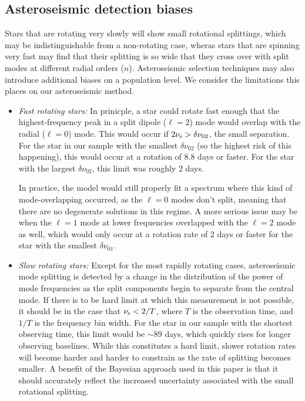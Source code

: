 \subsection{Asteroseismic detection biases}

Stars that are rotating very slowly will show small rotational splittings, which may be indistinguishable from a non-rotating case, wheras stars that are spinning very fast may find that their splitting is so wide that they cross over with split modes at different radial orders ($n$). Asteroseismic selection techniques may also introduce additional biases on a population level. We consider the limitations this places on our asteroseismic method.

\begin{itemize}
	\item \textit{Fast rotating stars:} In prinicple, a star could rotate fast enough that the highest-frequency peak in a split dipole ($\ell = 2$) mode would overlap with the radial ($\ell = 0$) mode. This would occur if $2\nu_{\rm s} > \delta\nu_{02}$, the small separation. For the star in our sample with the smallest $\delta\nu_{02}$ (so the highest risk of this happening), this would occur at a rotation of 8.8 days or faster. For the star with the largest $\delta\nu_{02}$, this limit was roughly 2 days.
	
	In practice, the model would still properly fit a spectrum where this kind of mode-overlapping occurred, as the $\ell = 0$ modes don't split, meaning that there are no degenerate solutions in this regime. A more serious issue may be when the $\ell = 1$ mode at lower frequencies overlapped with the $\ell = 2$ mode as well, which would only occur at a rotation rate of 2 days or faster for the star with the smallest $\delta\nu_{01}$.
	
	\item \textit{Slow rotating stars:} Except for the most rapidly rotating cases, asteroseismic mode splitting is detected by a change in the distribution of the power of mode frequencies as the split components begin to separate from the central mode. If there is to be hard limit at which this measurement is not possible, it should be in the case that $\nu_{\rm s} < 2/T$, where $T$ is the observation time, and $1/T$ is the frequency bin width. For the star in our sample with the shortest observing time, this limit would be $\sim 89$ days, which quickly rises for longer observing baselines. While this constitutes a hard limit, slower rotation rates will become harder and harder to constrain as the rate of splitting becomes smaller. A benefit of the Bayesian approach used in this paper is that it should accurately reflect the increased uncertainty associated with the small rotational splitting.
\end{itemize}

